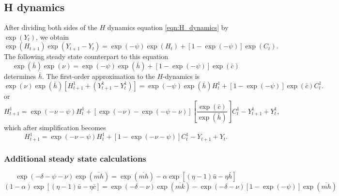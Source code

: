 \documentclass[12pt]{article}
\begin{document}
\subsection{H dynamics}
After dividing both sides of the  $H$ dynamics equation \eqref{eqn:H_dynamics}  by $\exp(Y_t)$, we obtain
\begin{equation}\label{eq:H_dynamics2}
\exp(H_{t+1})\exp(Y_{t+1} -Y_t)  = \exp(-\psi) \exp(H_t) + \left[1 - \exp( - \psi) \right] \exp(C_t).
\end{equation}
The following  steady state counterpart to this equation
\[
\exp({\bar h}) \exp(\nu) = \exp(-\psi) \exp({\bar h}) + [1 - \exp(-\psi)]\exp({\bar c})
\]
 determines ${\bar h}$.
The first-order approximation to the $H$-dynamics is
\[
\exp(\nu)\exp({\bar h}) \left[ H_{t+1}^1 + ( Y_{t+1}^1 - Y_t^1) \right] = \exp(-\psi) \exp({\bar h}) H_t^1 + [1 - \exp(-\psi)]\exp({\bar c})C_t^1 .
\]
or
\begin{equation*}
H_{t+1}^1  = \exp(-\nu -\psi) H_t^1 +  [\exp(-\nu) - \exp(-\psi - \nu)]\left[{\frac {\exp({\bar c})} {\exp({\bar h})}} \right] C_t^1 - Y_{t+1}^1 + Y_t^1 ,
\end{equation*}
which after simplification becomes
\begin{equation}\label{firstorderH}
H_{t+1}^1 =  \exp(-\nu -\psi) H_t^1 + [1 - \exp(-\nu - \psi)] C_t^1 - Y_{t+1} + Y_t .
\end{equation}







\subsubsection{Additional steady state calculations}
\[
\exp(-\delta - \psi - \nu)\exp\left( \overline{mh} \right) = \exp \left(\overline{mh} \right)  - \alpha \exp\left[ (\eta - 1) {\bar u}- \eta {\bar h}  \right]
\]
\[
(1 - \alpha) \exp\left[ (\eta - 1)  {\bar u} - \eta {\bar c} \right]  = \exp(-\delta-\nu) \exp\left( \overline{mk} \right) - \exp(-\delta - \nu) [1 - \exp(-\psi)]\exp\left({\overline{mh}}\right)
\]
\end{document}
